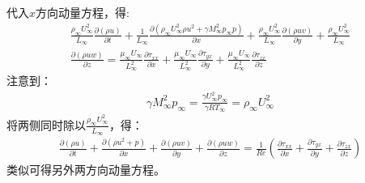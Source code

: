 \documentclass[12pt, a4paper]{article}
\begin{document}
代入$x$方向动量方程，得:
    \begin{equation}
        \begin{gathered}
            \frac{\rho_{\infty}U_{\infty}^{2}}{L_{\infty}}
            \frac{\partial(\rho u)}{\partial t} +
            \frac{1}{L_{\infty}}
            \frac{\partial(\rho_{\infty}U_{\infty}^{2}\rho u^{2} + \gamma M_{\infty}^{2}p_{\infty}p)}{\partial x} +
            \frac{\rho_{\infty}U_{\infty}^{2}}{L_{\infty}}
            \frac{\partial(\rho u v)}{\partial y} + 
            \frac{\rho_{\infty}U_{\infty}^{2}}{L_{\infty}} \\
            \frac{\partial(\rho u w)}{\partial z} =
            \frac{\mu_{\infty}U_{\infty}}{L_{\infty}^2}\frac{\partial{\tau_{xx}}}{\partial x} +
            \frac{\mu_{\infty}U_{\infty}}{L_{\infty}^2}\frac{\partial{\tau_{yx}}}{\partial y} +
            \frac{\mu_{\infty}U_{\infty}}{L_{\infty}^2}\frac{\partial{\tau_{zx}}}{\partial z}
        \end{gathered}
    \end{equation}
注意到：
    \begin{equation}
        \begin{gathered}
            \gamma M_{\infty}^{2}p_{\infty} = \frac{\gamma U_{\infty}^{2}p_{\infty}}{\gamma R T_{\infty}} = \rho_{\infty}U_{\infty}^{2}
        \end{gathered}
    \end{equation}
将两侧同时除以$\frac{\rho_{\infty}U_{\infty}^{2}}{L_{\infty}}$，得：
    \begin{equation}
        \begin{gathered}
            \frac{\partial(\rho u)}{\partial t} +
            \frac{\partial(\rho u^{2} + p)}{\partial x} +
            \frac{\partial(\rho u v)}{\partial y} +
            \frac{\partial(\rho u w)}{\partial z} =
            \frac{1}{Re}(\frac{\partial{\tau_{xx}}}{\partial x} + \frac{\partial{\tau_{yx}}}{\partial y} + \frac{\partial{\tau_{zx}}}{\partial z})
        \end{gathered}
    \end{equation}
类似可得另外两方向动量方程。
\end{document}
